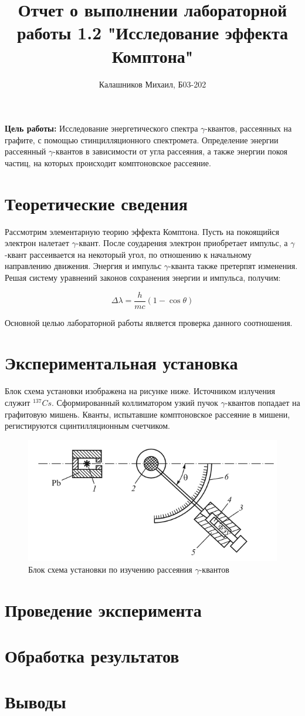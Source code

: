 \documentclass[14pt, a4paper]{report}
\title{\textbf{Отчет о выполнении лабораторной работы 1.2 "Исследование эффекта Комптона"}}
\author{Калашников Михаил, Б03-202}
\date{}
\begin{document}
\maketitle


\textbf{Цель работы:} Исследование энергетического спектра $\gamma$-квантов, рассеянных на графите, с помощью стинцилляционного спектромета. Определение энергии рассеянный $\gamma$-квантов в зависимости от угла рассеяния, а также энергии покоя частиц, на которых происходит комптоновское рассеяние.
\newline

\section{Теоретические сведения}

Рассмотрим элементарную теорию эффекта Комптона. Пусть на покоящийся электрон налетает $\gamma$-квант. После соударения электрон приобретает импульс, а $\gamma$-квант рассеивается на некоторый угол, по отношению к начальному направлению движения. Энергия и импульс $\gamma$-кванта также претерпят изменения. Решая систему уравнений законов сохранения энергии и импульса, получим:

\[\Delta\lambda=\frac{h}{mc}(1-\cos{\theta})\]

Основной целью лабораторной работы является проверка данного соотношения.

\section{Экспериментальная установка}

Блок схема установки изображена на рисунке ниже. Источником излучения служит $^{137}Cs$. Сформированный коллиматором узкий пучок $\gamma$-квантов попадает на графитовую мишень. Кванты, испытавшие комптоновское рассеяние в мишени, регистируются сцинтилляционным счетчиком.

\begin{figure}[H]
\centering
\includegraphics[scale=0.8]{../images/512-1}
\caption{Блок схема установки по изучению рассеяния $\gamma$-квантов}
\end{figure}

\section{Проведение эксперимента}

\section{Обработка результатов}

\section{Выводы}
\end{document}
